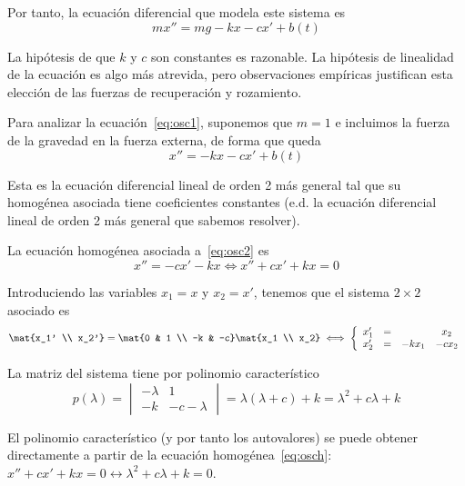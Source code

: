 \documentclass[../ecuaciones_diferenciales.tex]{subfiles}
\begin{document}
Por tanto, la ecuación diferencial que modela este sistema es
\begin{equation} \label{eq:osc1}
	mx'' = mg - kx - cx' + b(t)
\end{equation}

\begin{remark}
	La hipótesis de que \(k\) y \(c\) son constantes es razonable. La hipótesis de
	linealidad de la ecuación es algo más atrevida, pero observaciones empíricas
	justifican esta elección de las fuerzas de recuperación y rozamiento.
\end{remark}

Para analizar la ecuación~\eqref{eq:osc1}, suponemos que \(m=1\) e incluimos la
fuerza de la gravedad en la fuerza externa, de forma que queda
\begin{equation} \label{eq:osc2}
	x'' = - kx - cx' + b(t)
\end{equation}

\begin{remark}
	Esta es la ecuación diferencial lineal de orden 2 más general tal que su
	homogénea asociada tiene coeficientes constantes (e.d. la ecuación diferencial
	lineal de orden 2 más general que sabemos resolver).
\end{remark}

La ecuación homogénea asociada a~\eqref{eq:osc2} es
\begin{equation} \label{eq:osch}
	x'' = - cx' - kx \iff x'' + cx' + kx = 0
\end{equation}

Introduciendo las variables \(x_1 = x\) y \(x_2 = x'\), tenemos que el sistema
\(2 \times 2\) asociado es
\[\mat{x_1' \\ x_2'} = \mat{0 & 1 \\ -k & -c} \mat{x_1 \\ x_2} \iff
	\left\{\begin{array}{c c c c}
		x_1' & = &       & x_2   \\
		x_2' & = & -kx_1 & -cx_2
	\end{array}\right.
\]

La matriz del sistema tiene por polinomio característico
\[
	p(\lambda) =
	\begin{vmatrix}
		-\lambda & 1 \\ -k & -c-\lambda
	\end{vmatrix} =
	\lambda(\lambda + c) + k = \lambda^2 + c\lambda + k
\]
\begin{remark}
	El polinomio característico (y por tanto los autovalores) se puede obtener
	directamente a partir de la ecuación homogénea~\eqref{eq:osch}: \(x'' + cx' +
	kx = 0 \leftrightarrow \lambda^2 + c\lambda + k = 0\).
\end{remark}
\end{document}
